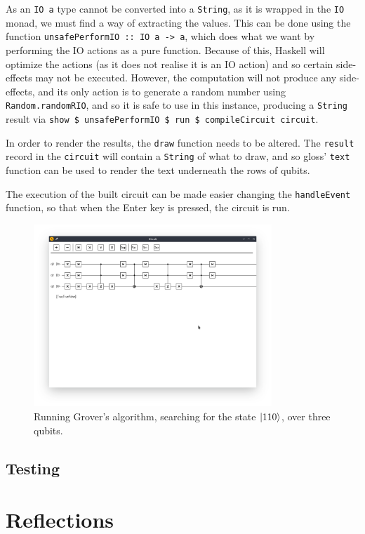 \documentclass[a4paper,10pt, titlepage, twoside]{article}
\begin{document}
As an \texttt{IO a} type cannot be converted into a \texttt{String}, as it is wrapped in the \texttt{IO} monad, we must find a way of extracting the values. This can be done using the function \texttt{unsafePerformIO :: IO a -> a}, which does what we want by performing the IO actions as a pure function. Because of this, Haskell will optimize the actions (as it does not realise it is an IO action) and so certain side-effects may not be executed. However, the computation will not produce any side-effects, and its only action is to generate a random number using \texttt{Random.randomRIO}, and so it is safe to use in this instance, producing a \texttt{String} result via \texttt{show \$ unsafePerformIO \$ run \$ compileCircuit circuit}.\par
In order to render the results, the \texttt{draw} function needs to be altered. The \texttt{result} record in the \texttt{circuit} will contain a \texttt{String} of what to draw, and so gloss' \texttt{text} function can be used to render the text underneath the rows of qubits. \par
The execution of the built circuit can be made easier changing the \texttt{handleEvent} function, so that when the Enter key is pressed, the circuit is run.
\begin{figure}[H]
    \centering
    \includegraphics[width=0.8\textwidth]{rungrover}
    \caption{Running Grover's algorithm, searching for the state $\ket{110}$, over three qubits.}
\end{figure}



\subsection{Testing}


\section{Reflections}

\newpage


\end{document}
